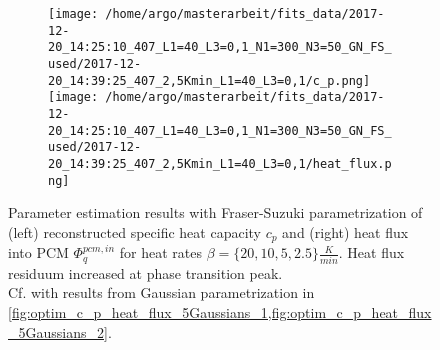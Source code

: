 \documentclass{scrartcl}[12pt, halfparskip]
\numberwithin{equation}{section}
\numberwithin{figure}{section}
\numberwithin{table}{section}
\begin{document}
\begin{figure}[H]
	\begin{subfigure}{1.\textwidth}
		\texttt{[image: /home/argo/masterarbeit/fits\_data/2017-12-20\_14:25:10\_407\_L1=40\_L3=0,1\_N1=300\_N3=50\_GN\_FS\_used/2017-12-20\_14:39:25\_407\_2,5Kmin\_L1=40\_L3=0,1/c\_p.png]}
		\texttt{[image: /home/argo/masterarbeit/fits\_data/2017-12-20\_14:25:10\_407\_L1=40\_L3=0,1\_N1=300\_N3=50\_GN\_FS\_used/2017-12-20\_14:39:25\_407\_2,5Kmin\_L1=40\_L3=0,1/heat\_flux.png]}
	\end{subfigure}
	\caption{Parameter estimation results with Fraser-Suzuki parametrization of (left) reconstructed specific heat capacity $c_p$ and (right) heat flux into PCM $\varPhi_q^{pcm,in}$ for heat rates $\beta=\{ 20, 10, 5, 2.5 \} \frac{K}{min}$. Heat flux residuum increased at phase transition peak. \\
	Cf. with results from Gaussian parametrization in \cref{fig:optim_c_p_heat_flux_5Gaussians_1,fig:optim_c_p_heat_flux_5Gaussians_2}.}
	\label{fig:optim_c_p_heat_flux_FS_1}
\end{figure}
\end{document}
